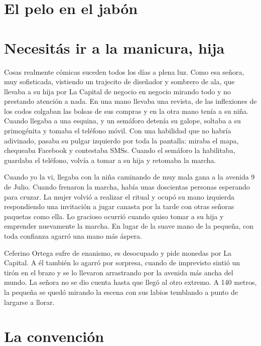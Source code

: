 \documentclass[11pt,twoside,openright,a6paper]{book}
\begin{document}
\chapter*{El pelo en el jabón}


\chapter*{Necesitás ir a la manicura, hija}

Cosas realmente cómicas suceden todos los días a plena luz. Como esa señora, muy sofisticada, vistiendo un trajecito de diseñador y sombrero de ala, que llevaba a su hija por La Capital de negocio en negocio mirando todo y no prestando atención a nada. En una mano llevaba una revista, de las inflexiones de los codos colgaban las bolsas de sus compras y en la otra mano tenía a su niña. Cuando llegaba a una esquina, y un semáforo detenía su galope, soltaba a su primogénita y tomaba el teléfono móvil. Con una habilidad que no habría adivinado, pasaba su pulgar izquierdo por toda la pantalla: miraba el mapa, chequeaba Facebook y contestaba SMSs. Cuando el semáforo la habilitaba, guardaba el teléfono, volvía a tomar a su hija y retomaba la marcha.

Cuando yo la vi, llegaba con la niña caminando de muy mala gana a la avenida 9 de Julio. Cuando frenaron la marcha, había unas doscientas personas esperando para cruzar. La mujer volvió a realizar el ritual y ocupó su mano izquierda respondiendo una invitación a jugar canasta por la tarde con otras señoras paquetas como ella. Lo gracioso ocurrió cuando quiso tomar a su hija y emprender nuevamente la marcha. En lugar de la suave mano de la pequeña, con toda confianza agarró una mano más áspera.

Ceferino Ortega sufre de enanismo, es desocupado y pide monedas por La Capital. A él también lo agarró por sorpresa, cuando de imprevisto sintió un tirón en el brazo y se lo llevaron arrastrando por la avenida más ancha del mundo. La señora no se dio cuenta hasta que llegó al otro extremo. A 140 metros, la pequeña se quedó mirando la escena con sus labios temblando a punto de largarse a llorar.

\chapter*{La convención}
\end{document}
